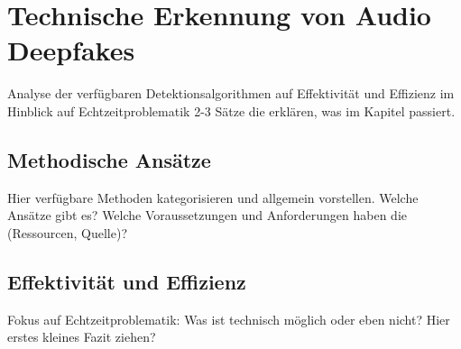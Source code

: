 \section{Technische Erkennung von Audio Deepfakes}
Analyse der verfügbaren Detektionsalgorithmen auf Effektivität und Effizienz im Hinblick auf Echtzeitproblematik
2-3 Sätze die erklären, was im Kapitel passiert.
\subsection{Methodische Ansätze}
Hier verfügbare Methoden kategorisieren und allgemein vorstellen.
Welche Ansätze gibt es?
Welche Voraussetzungen und Anforderungen haben die (Ressourcen, Quelle)?
\subsection{Effektivität und Effizienz}
Fokus auf Echtzeitproblematik: Was ist technisch möglich oder eben nicht?
Hier erstes kleines Fazit ziehen?